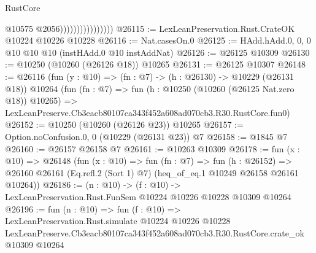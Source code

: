 \begin{lexlean}{RustCore}
\begin{coremodule}
                                    @10575
                                    @2056))))))))))))))))
@26115 := LexLeanPreservation.Rust.CrateOK @10224 @10226 @10228
@26116 := Nat.casesOn.{0}
@26125 := HAdd.hAdd.{0, 0, 0} @10 @10 @10 (instHAdd.{0} @10 instAddNat)
@26126 := @26125 @10309
@26130 := @10250 (@10260 (@26126 @18)) @10265
@26131 := @26125 @10307
@26148 := @26116
    (fun (y : @10) => (fn : @7) -> (h : @26130) -> @10229 (@26131 @18))
    @10264
    (fun (fn : @7) =>
    fun (h : @10250 (@10260 (@26125 Nat.zero @18)) @10265) =>
    LexLeanPreserve.Cb3eacb80107ca343f452a608ad070cb3.R30.RustCore.fun0)
@26152 := @10250 (@10260 (@26126 @23)) @10265
@26157 := Option.noConfusion.{0, 0} (@10229 (@26131 @23)) @7
@26158 := @1845 @7
@26160 := @26157 @26158 @7
@26161 := @10263 @10309
@26178 := fun (x : @10) =>
  @26148
    (fun (x : @10) =>
    fun (fn : @7) =>
    fun (h : @26152) =>
    @26160 @26161 (Eq.refl.{2} (Sort 1) @7) (heq_of_eq.{1} @10249 @26158 @26161 @10264))
@26186 := (n : @10) ->
  (f : @10) -> LexLeanPreservation.Rust.FunSem @10224 @10226 @10228 @10309 @10264
@26196 := fun (n : @10) =>
  fun (f : @10) =>
  LexLeanPreservation.Rust.simulate
    @10224
    @10226
    @10228
    LexLeanPreserve.Cb3eacb80107ca343f452a608ad070cb3.R30.RustCore.crate_ok
    @10309
    @10264
\end{coremodule}
\end{lexlean}
